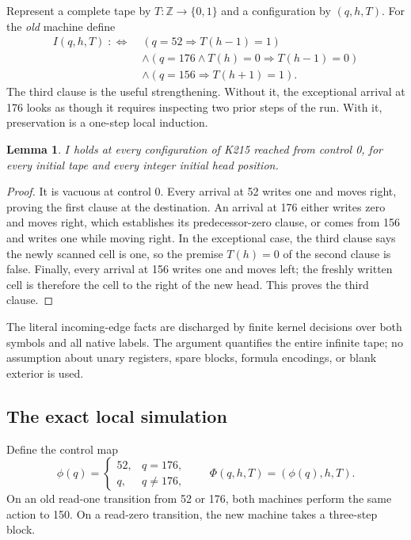 \documentclass[11pt]{article}
\newtheorem{lemma}[theorem]{Lemma}
\begin{document}
Represent a complete tape by $T:\mathbb Z\to\{0,1\}$ and a configuration by $(q,h,T)$. For the \emph{old} machine define
\begin{align*}
 I(q,h,T)\;:\Longleftrightarrow\;&(q=52\Rightarrow T(h-1)=1)\\
 &\land(q=176\land T(h)=0\Rightarrow T(h-1)=0)\\
 &\land(q=156\Rightarrow T(h+1)=1).
\end{align*}
The third clause is the useful strengthening. Without it, the exceptional arrival at 176 looks as though it requires inspecting two prior steps of the run. With it, preservation is a one-step local induction.

\begin{lemma}
$I$ holds at every configuration of K215 reached from control 0, for every initial tape and every integer initial head position.
\end{lemma}
\begin{proof}
It is vacuous at control 0. Every arrival at 52 writes one and moves right, proving the first clause at the destination. An arrival at 176 either writes zero and moves right, which establishes its predecessor-zero clause, or comes from 156 and writes one while moving right. In the exceptional case, the third clause says the newly scanned cell is one, so the premise $T(h)=0$ of the second clause is false. Finally, every arrival at 156 writes one and moves left; the freshly written cell is therefore the cell to the right of the new head. This proves the third clause.
\end{proof}

The literal incoming-edge facts are discharged by finite kernel decisions over both symbols and all native labels. The argument quantifies the entire infinite tape; no assumption about unary registers, spare blocks, formula encodings, or blank exterior is used.

\subsection{The exact local simulation}

Define the control map
\[
 \phi(q)=\begin{cases}52,&q=176,\\q,&q\ne176,\end{cases}
 \qquad \Phi(q,h,T)=(\phi(q),h,T).
\]
On an old read-one transition from 52 or 176, both machines perform the same action to 150. On a read-zero transition, the new machine takes a three-step block.
\end{document}
